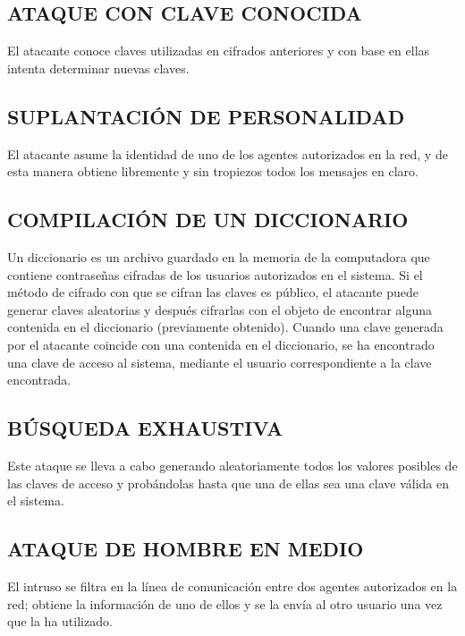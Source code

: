 \subsection{ATAQUE CON CLAVE CONOCIDA}
El atacante conoce claves utilizadas en cifrados anteriores y con base en ellas intenta determinar nuevas claves.

\subsection{SUPLANTACIÓN DE PERSONALIDAD}
El atacante asume la identidad de uno de los agentes autorizados en la red, y de esta manera obtiene libremente y sin tropiezos todos los mensajes en claro.

\subsection{COMPILACIÓN DE UN DICCIONARIO}
Un diccionario es un archivo guardado en la memoria de la computadora que contiene contraseñas cifradas de los usuarios autorizados en el sistema. Si el método de cifrado con que se cifran las claves es público, el atacante puede generar claves aleatorias y después cifrarlas con el objeto de encontrar alguna contenida en el diccionario (previamente obtenido). Cuando una clave generada por el atacante coincide con una contenida en el diccionario, se ha encontrado una clave de acceso al sistema, mediante el usuario correspondiente a la clave encontrada.

\subsection{BÚSQUEDA EXHAUSTIVA}
Este ataque se lleva a cabo generando aleatoriamente todos los valores posibles de las claves de acceso y probándolas hasta que una de ellas sea una clave válida en el sistema.

\subsection{ATAQUE DE HOMBRE EN MEDIO}
El intruso se filtra en la línea de comunicación entre dos agentes autorizados en la red; obtiene la información de uno de ellos y se la envía al otro usuario una vez que la ha utilizado.

